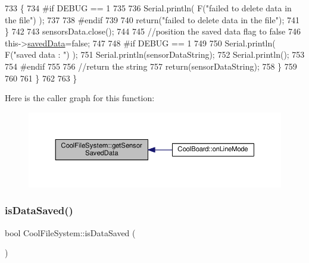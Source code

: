 \begin{DoxyCode}
733             \{
734 \textcolor{preprocessor}{            #if DEBUG == 1}
735         
736                 Serial.println( F(\textcolor{stringliteral}{"failed to delete data in the file"}) );
737         
738 \textcolor{preprocessor}{            #endif}
739 
740                 \textcolor{keywordflow}{return}(\textcolor{stringliteral}{"failed to delete data in the file"});
741             \}
742 
743             sensorsData.close();
744             
745             \textcolor{comment}{//position the saved data flag to false}
746             this->\hyperlink{classCoolFileSystem_ad398e0c5c41a0c88acdf5d672aa71351}{savedData}=\textcolor{keyword}{false}; 
747             
748 \textcolor{preprocessor}{        #if DEBUG == 1 }
749 
750             Serial.println( F(\textcolor{stringliteral}{"saved data : "}) );
751             Serial.println(sensorDataString);
752             Serial.println();
753         
754 \textcolor{preprocessor}{        #endif}
755 
756             \textcolor{comment}{//return the string}
757             \textcolor{keywordflow}{return}(sensorDataString);       
758         \}
759         
760         
761     \}
762 
763 \}
\end{DoxyCode}
Here is the caller graph for this function\+:\nopagebreak
\begin{figure}[H]
\begin{center}
\leavevmode
\includegraphics[width=350pt]{classCoolFileSystem_a5c58bca3735c0ed3efb268d70ef998ef_icgraph}
\end{center}
\end{figure}
\mbox{\label{classCoolFileSystem_a5a7eaeea7a9fbf8aaef651d862fa3b5b}} 
\subsubsection{\texorpdfstring{is\+Data\+Saved()}{isDataSaved()}}
{\footnotesize\ttfamily bool Cool\+File\+System\+::is\+Data\+Saved (\begin{DoxyParamCaption}{ }\end{DoxyParamCaption})}

